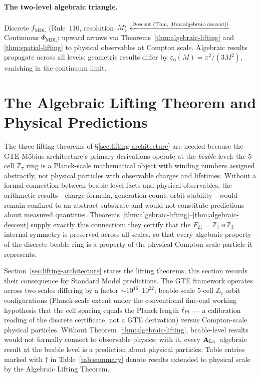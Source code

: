 \documentclass[12pt,letterpaper]{article}
\newcommand{\fmdl}{f_{\mathrm{MDL}}}
\newcommand{\Zseven}{\mathbb{Z}_7}
\newcommand{\Zthree}{\mathbb{Z}_3}
\newcommand{\catAL}{\ensuremath{\textbf{A}_{\rm L4}}}
\begin{document}
\paragraph{The two-level algebraic triangle.}
Discrete $\fmdl$ (Rule~110, resolution~$M$) $\xleftarrow{\text{Descent
(Thm.~\ref{thm:algebraic-descent})}}$ Continuous $\Phi_{\mathrm{MDL}}$;
upward arrows via Theorems~\ref{thm:algebraic-lifting} and
\ref{thm:spatial-lifting} to physical observables at Compton scale.
Algebraic results propagate across all levels; geometric results differ by
$\varepsilon_0(M) = \pi^2/(3M^2)$, vanishing in the continuum limit.

\section{The Algebraic Lifting Theorem and Physical Predictions}
\label{sec:lifting-theorem}

The three lifting theorems of \S\ref{sec:lifting-architecture} are needed because
the GTE-M\"{o}bius architecture's primary derivations operate at the \emph{beable} level:
the 5-cell $\Zseven$ ring is a Planck-scale mathematical object with winding numbers
assigned abstractly, not physical particles with observable charges and lifetimes.
Without a formal connection between beable-level facts and physical observables,
the arithmetic results---charge formula, generation count, orbit stability---would
remain confined to an abstract substrate and would not constitute predictions about
measured quantities.
Theorems~\ref{thm:algebraic-lifting}--\ref{thm:algebraic-descent} supply exactly
this connection: they certify that the $F_{21} = \Zseven \rtimes \Zthree$ internal
symmetry is preserved across all scales, so that every algebraic property of the
discrete beable ring is a property of the physical Compton-scale particle it represents.

Section~\ref{sec:lifting-architecture} states the lifting theorems; this section
records their consequence for Standard Model predictions.
The GTE framework operates across two scales differing by a factor
$\sim 10^{16}$--$10^{22}$: beable-scale 5-cell $\Zseven$ orbit configurations
(Planck-scale extent under the conventional fine-end working hypothesis that
the cell spacing equals the Planck length $\ell_{\rm Pl}$ --- a calibration
reading of the discrete certificate, not a GTE derivation) versus
Compton-scale physical particles.
Without Theorem~\ref{thm:algebraic-lifting}, beable-level results would not
formally connect to observable physics; with it, every \catAL\ algebraic result
at the beable level is a prediction about physical particles.
Table entries marked with $\dagger$ in Table~\ref{tab:summary} denote results
extended to physical scale by the Algebraic Lifting Theorem.
\end{document}
